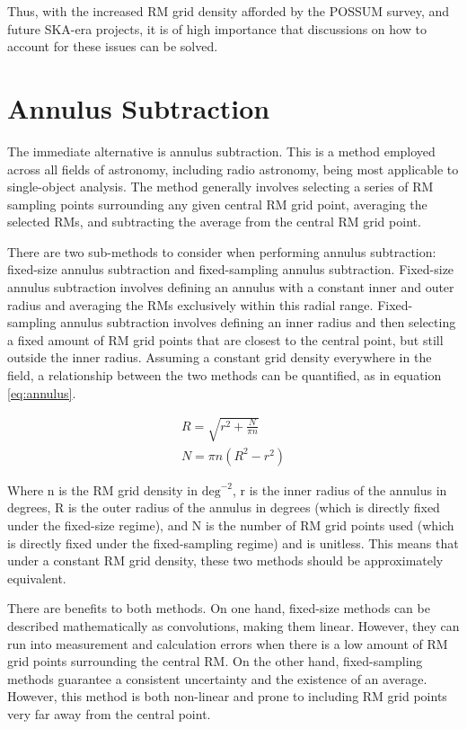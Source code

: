 Thus, with the increased RM grid density afforded by the POSSUM survey, and future SKA-era projects, it is of high importance that discussions on how to account for these issues can be solved.

\section{Annulus Subtraction}
\label{sec:annulus}

The immediate alternative is annulus subtraction. This is a method employed across all fields of astronomy, including radio astronomy, being most applicable to single-object analysis. The method generally involves selecting a series of RM sampling points surrounding any given central RM grid point, averaging the selected RMs, and subtracting the average from the central RM grid point.

There are two sub-methods to consider when performing annulus subtraction: fixed-size annulus subtraction and fixed-sampling annulus subtraction. Fixed-size annulus subtraction involves defining an annulus with a constant inner and outer radius and averaging the RMs exclusively within this radial range. Fixed-sampling annulus subtraction involves defining an inner radius and then selecting a fixed amount of RM grid points that are closest to the central point, but still outside the inner radius. Assuming a constant grid density everywhere in the field, a relationship between the two methods can be quantified, as in equation \ref{eq:annulus}.

\begin{equation}
    \begin{split}
        R = \sqrt{r^2 + \frac{N}{\pi n}} \\
        N = \pi n \left( R^2 - r^2 \right)
    \end{split}
    \label{eq:annulus}
\end{equation}

Where n is the RM grid density in $\mathrm{deg}^{-2}$, r is the inner radius of the annulus in degrees, R is the outer radius of the annulus in degrees (which is directly fixed under the fixed-size regime), and N is the number of RM grid points used (which is directly fixed under the fixed-sampling regime) and is unitless. This means that under a constant RM grid density, these two methods should be approximately equivalent.


There are benefits to both methods. On one hand, fixed-size methods can be described mathematically as convolutions, making them linear. However, they can run into measurement and calculation errors when there is a low amount of RM grid points surrounding the central RM. On the other hand, fixed-sampling methods guarantee a consistent uncertainty and the existence of an average. However, this method is both non-linear and prone to including RM grid points very far away from the central point.


